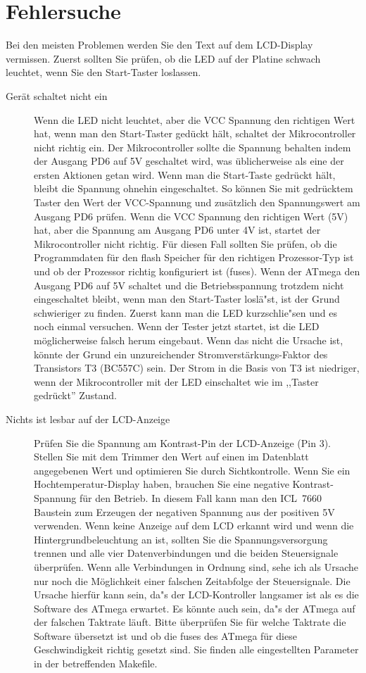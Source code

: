 \section{Fehlersuche}
Bei den meisten Problemen werden Sie den Text auf dem LCD-Display vermissen.
Zuerst sollten Sie pr\"ufen, ob die LED auf der Platine schwach leuchtet, wenn Sie den Start-Taster
loslassen.
\begin{description}

\item[Ger\"at schaltet nicht ein]  
Wenn die LED nicht leuchtet, aber die VCC Spannung den richtigen Wert hat, wenn
man den Start-Taster ged\"uckt h\"alt, schaltet der Mikrocontroller nicht richtig ein.
Der Mikrocontroller sollte die Spannung behalten indem der Ausgang PD6 auf 5V
geschaltet wird, was \"ublicherweise als eine der ersten Aktionen getan wird.
Wenn man die Start-Taste gedr\"uckt h\"alt, bleibt die Spannung ohnehin eingeschaltet.
So k\"onnen Sie mit gedr\"ucktem Taster den Wert der VCC-Spannung und zus\"atzlich den Spannungswert am
Ausgang PD6 pr\"ufen.
Wenn die VCC Spannung den richtigen Wert (5V) hat, aber die Spannung am Ausgang
PD6 unter 4V ist, startet der Mikrocontroller nicht richtig.
F\"ur diesen Fall sollten Sie pr\"ufen, ob die Programmdaten f\"ur den flash Speicher
f\"ur den richtigen Prozessor-Typ ist und ob der Prozessor richtig konfiguriert ist (fuses).
Wenn der ATmega den Ausgang PD6 auf 5V schaltet und die Betriebsspannung 
trotzdem nicht eingeschaltet bleibt, wenn man den Start-Taster losl\"a"st, ist der
Grund schwieriger zu finden.
Zuerst kann man die LED kurzschlie"sen und es noch einmal versuchen.
Wenn der Tester jetzt startet, ist die LED m\"oglicherweise falsch herum eingebaut.
Wenn das nicht die Ursache ist, k\"onnte der Grund ein unzureichender Stromverst\"arkungs-Faktor
des Transistors T3 (BC557C) sein.
Der Strom in die Basis von T3 ist niedriger, wenn der Mikrocontroller mit der LED einschaltet
wie im ,,Taster gedr\"uckt'' Zustand.

\item[Nichts ist lesbar auf der LCD-Anzeige] 
Pr\"ufen Sie die Spannung am Kontrast-Pin der LCD-Anzeige (Pin 3).
Stellen Sie mit dem Trimmer den Wert auf einen im Datenblatt angegebenen Wert und optimieren Sie
durch Sichtkontrolle.
Wenn Sie ein Hochtemperatur-Display haben, brauchen Sie eine negative Kontrast-Spannung f\"ur
den Betrieb.
In diesem Fall kann man den ICL~7660 Baustein zum Erzeugen der negativen Spannung aus der
positiven 5V verwenden.
Wenn keine Anzeige auf dem LCD erkannt wird und wenn die Hintergrundbeleuchtung an ist,
sollten Sie die Spannungsversorgung trennen und alle vier Datenverbindungen und die 
beiden Steuersignale \"uberpr\"ufen.
Wenn alle Verbindungen in Ordnung sind, sehe ich als Ursache nur noch die M\"oglichkeit einer
falschen Zeitabfolge der Steuersignale.
Die Ursache hierf\"ur kann sein, da"s der LCD-Kontroller langsamer ist als es die Software
des ATmega erwartet. Es k\"onnte auch sein, da"s der ATmega auf der falschen Taktrate l\"auft.
Bitte \"uberpr\"ufen Sie f\"ur welche Taktrate die Software \"ubersetzt ist und ob
die fuses des ATmega f\"ur diese Geschwindigkeit richtig gesetzt sind.
Sie finden alle eingestellten Parameter in der betreffenden Makefile.


\end{description}
